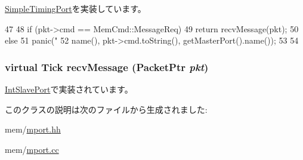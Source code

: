\hyperlink{classSimpleTimingPort_a428ab07671bc9372dc44a2487b12a726}{SimpleTimingPort}を実装しています。


\begin{DoxyCode}
47 {
48     if (pkt->cmd == MemCmd::MessageReq) {
49         return recvMessage(pkt);
50     } else {
51         panic("%
52               name(), pkt->cmd.toString(), getMasterPort().name());
53     }
54 }
\end{DoxyCode}
\hypertarget{classMessageSlavePort_aa3b469f80ff640585c37fae6064062a3}{
\subsubsection[{recvMessage}]{\setlength{\rightskip}{0pt plus 5cm}virtual {\bf Tick} recvMessage ({\bf PacketPtr} {\em pkt})}}
\label{classMessageSlavePort_aa3b469f80ff640585c37fae6064062a3}


\hyperlink{classX86ISA_1_1IntDevice_1_1IntSlavePort_a3dad3b561a1022eee5fab74df92ce766}{IntSlavePort}で実装されています。

このクラスの説明は次のファイルから生成されました:\begin{DoxyCompactItemize}
\item 
mem/\hyperlink{mport_8hh}{mport.hh}\item 
mem/\hyperlink{mport_8cc}{mport.cc}\end{DoxyCompactItemize}
